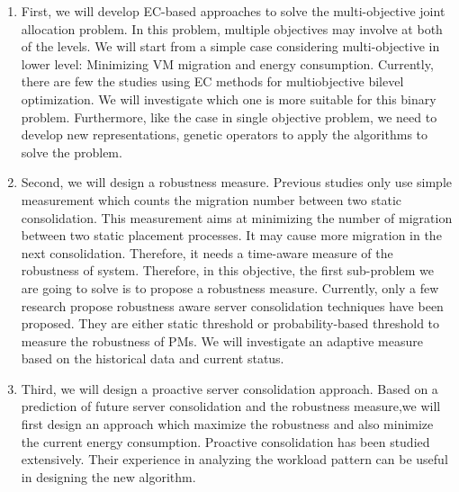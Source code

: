 \begin{enumerate}
	\item First, we will develop EC-based approaches to solve the multi-objective joint allocation problem. In this problem, multiple objectives may involve at both of the levels. We will start from a simple case considering multi-objective in lower level: Minimizing VM migration and energy consumption.  Currently,  there are few the studies using EC methods \cite{Yin:2000ut,Deb:2010wh} for multiobjective bilevel optimization. We will investigate which one is more suitable for this binary problem. Furthermore, like the case in single objective problem, we need to develop new representations, genetic operators to apply the algorithms to solve the problem.


	\item Second, we will design a robustness measure. Previous studies only use simple measurement which counts the migration number between two static consolidation. This measurement aims at minimizing the number of migration between two  static placement processes. It may cause more migration in the next consolidation. Therefore, it needs a time-aware measure of the robustness of system. Therefore, in this objective, the first sub-problem we are going to solve is to propose a robustness measure. Currently, only a few research propose robustness aware server consolidation techniques \cite{Takouna:2014ua, Grimes:2016vv} have been proposed. They are either static threshold or probability-based threshold to measure the robustness of PMs. We will investigate an adaptive measure based on the historical data and current status.
	
	\item Third, we will design a proactive server consolidation approach. Based on a prediction of future server consolidation and the robustness measure,we will first design an approach which maximize the robustness and also minimize the current energy consumption. Proactive consolidation \cite{Farahnakian:2015vj,Tan:2011vy} has been studied extensively. Their experience in analyzing the workload pattern can be useful in designing the new algorithm.
	

	\end{enumerate}

